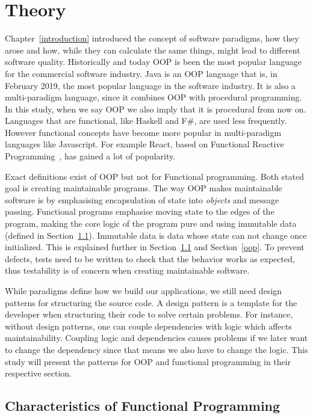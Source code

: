 \chapter{Theory}\label{theory} 

Chapter~\ref{introduction} introduced the concept of software paradigms, how
they arose and how, while they can calculate the same things, might lead to
different software quality. Historically and today OOP is been the most popular
language for the commercial software industry. Java is an OOP language that is,
in February 2019, the most popular language in the software industry. It is also
a multi-paradigm language, since it combines OOP with procedural programming. In
this study, when we say OOP we also imply that it is procedural from now on.
Languages that are functional, like Haskell and F\#, are used less
frequently.~\cite{tiobe} However functional concepts have become more popular in
multi-paradigm languages like Javascript. For example React, based on Functional
Reactive Programming~\cite{reactisfrp}, has gained a lot of
popularity.~\cite{popularityreact} 

Exact definitions exist of OOP but not for Functional programming. Both stated
goal is creating maintainable programs.  The way OOP makes maintainable
software is by emphasising encapsulation of state into \textit{objects} and
message passing. Functional programs emphasise moving state to the edges of the
program, making the core logic of the program pure and using immutable data
(defined in Section~\ref{functionalprogramming}). Immutable data is data whose
state can not change once initialized. This is explained further in
Section~\ref{functionalprogramming} and Section~\ref{oop}. To prevent defects,
tests need to be written to check that the behavior works as expected, thus
testability is of concern when creating maintainable software.

While paradigms define how we build our applications, we still need design
patterns for structuring the source code. A design pattern is a template for the
developer when structuring their code to solve certain problems. For instance,
without design patterns, one can couple dependencies with logic which affects
maintainability. Coupling logic and dependencies causes problems if we later
want to change the dependency since that means we also have to change the logic.
This study will present the patterns for OOP and functional programming in their
respective section. 

\section{Characteristics of Functional Programming}\label{functionalprogramming}


